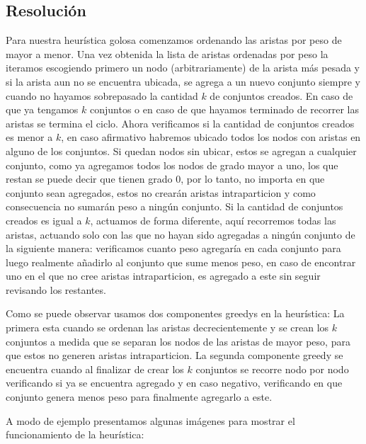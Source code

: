 \subsection{Resoluci\'on}

Para nuestra heurística golosa comenzamos ordenando las aristas por peso de mayor a menor. Una vez obtenida la lista de aristas ordenadas por peso la iteramos escogiendo primero un nodo (arbitrariamente) de la arista más pesada y si la arista aun no se encuentra ubicada, se agrega a un nuevo conjunto siempre y cuando no hayamos sobrepasado la cantidad $k$ de conjuntos creados. En caso de que ya tengamos $k$ conjuntos o en caso de que hayamos terminado de recorrer las aristas se termina el ciclo.
Ahora verificamos si la cantidad de conjuntos creados es menor a $k$, en caso afirmativo habremos ubicado todos los nodos con aristas en alguno de los conjuntos.
Si quedan nodos sin ubicar, estos se agregan a cualquier conjunto, como ya agregamos todos los nodos de grado mayor a uno, los que restan se puede decir que tienen grado 0, por lo tanto, no importa en que conjunto sean agregados, estos no crearán aristas intraparticion y como consecuencia no sumarán peso a ningún conjunto.
Si la cantidad de conjuntos creados es igual a $k$, actuamos de forma diferente, aquí recorremos todas las aristas, actuando solo con las que no hayan sido agregadas a ningún conjunto de la siguiente manera: verificamos cuanto peso agregaría en cada conjunto para luego realmente añadirlo al conjunto que sume menos peso, en caso de encontrar uno en el que no cree aristas intraparticion, es agregado a este sin seguir revisando los restantes.

Como se puede observar usamos dos componentes greedys en la heurística:
La primera esta cuando se ordenan las aristas decrecientemente y se crean los $k$ conjuntos a medida que se separan los nodos de las aristas de mayor peso, para que estos no generen aristas intraparticion.
La segunda componente greedy se encuentra cuando al finalizar de crear los $k$ conjuntos se recorre nodo por nodo verificando si ya se encuentra agregado y en caso negativo, verificando en que conjunto genera menos peso para finalmente agregarlo a este.

A modo de ejemplo presentamos algunas imágenes para mostrar el funcionamiento de la heurística:

